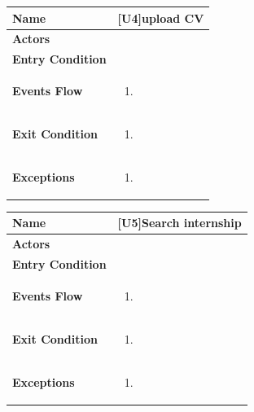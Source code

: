 \begin{center}
    \begin{tabular}{|p{9em}|p{27em}|}
        \hline
        \rowcolor{bluepoli!40} %
        \textbf{Name} & \textbf{[U4]upload CV} \\
        \hline
        \textbf{Actors} &  \\
        \hline
        \textbf{Entry Condition} &  \\
        \hline
        \textbf{Events Flow} & 
        \begin{enumerate}
            \item 
        \end{enumerate} \\
        \hline
        \textbf{Exit Condition} & 
        \begin{enumerate}
            \item 
        \end{enumerate} \\
        \hline
        \textbf{Exceptions} &
        \begin{enumerate}
            \item
        \end{enumerate} \\
        \hline
    \end{tabular}
\end{center}

\begin{center}
    \begin{tabular}{|p{9em}|p{27em}|}
        \hline
        \rowcolor{bluepoli!40} %
        \textbf{Name} & \textbf{[U5]Search internship} \\
        \hline
        \textbf{Actors} &  \\
        \hline
        \textbf{Entry Condition} &  \\
        \hline
        \textbf{Events Flow} & 
        \begin{enumerate}
            \item 
        \end{enumerate} \\
        \hline
        \textbf{Exit Condition} & 
        \begin{enumerate}
            \item 
        \end{enumerate} \\
        \hline
        \textbf{Exceptions} &
        \begin{enumerate}
            \item
        \end{enumerate} \\
        \hline
    \end{tabular}
\end{center}

